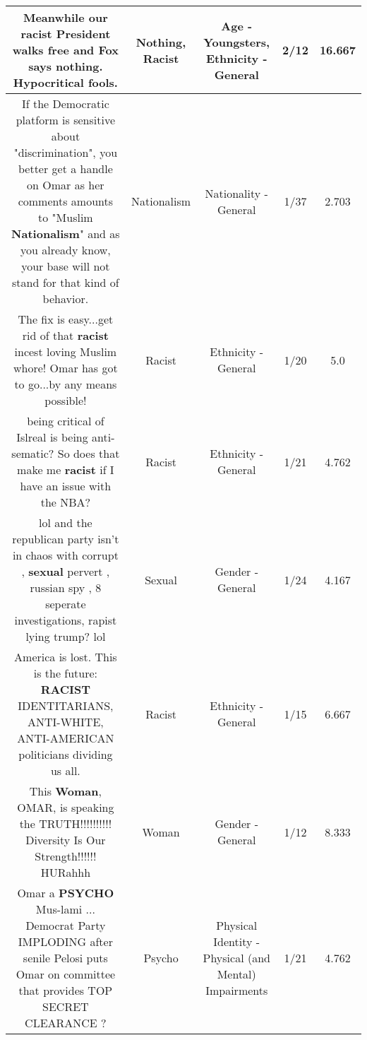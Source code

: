 \documentclass[11pt]{article}
\newlength\mylength
\begin{document}
\begin{center}
\begin{longtable}{|C{.65\mylength}|C{.30\mylength}|C{.12\mylength}|C{.12\mylength}|C{.12\mylength}|}
  \small Meanwhile our \textbf{racist} President walks free and Fox says \textbf{nothing}. Hypocritical fools.\normalsize   & Nothing, Racist & Age - Youngsters, Ethnicity - General & 2/12 & 16.667 \\  \hline
  \small If the Democratic platform is sensitive about "discrimination", you better get a handle on Omar as her comments amounts to "Muslim \textbf{Nationalism}" and as you already know, your base will not stand for that kind of behavior.\normalsize   & Nationalism & Nationality - General & 1/37 & 2.703 \\  \hline
  \small The fix is easy...get rid of that \textbf{racist} incest loving Muslim whore! Omar has got to go...by any means possible!\normalsize   & Racist & Ethnicity - General & 1/20 & 5.0 \\  \hline
  \small being critical of Islreal is being anti-sematic? So does that make me \textbf{racist} if I have an issue with the NBA?\normalsize   & Racist & Ethnicity - General & 1/21 & 4.762 \\  \hline
  \small lol and the republican party isn't in chaos with corrupt , \textbf{sexual} pervert , russian spy , 8 seperate investigations, rapist lying trump? lol\normalsize   & Sexual & Gender - General & 1/24 & 4.167 \\  \hline
  \small America is lost. This is the future: \textbf{RACIST} IDENTITARIANS, ANTI-WHITE, ANTI-AMERICAN politicians dividing us all.\normalsize   & Racist & Ethnicity - General & 1/15 & 6.667 \\  \hline
  \small This \textbf{Woman}, OMAR, is speaking the TRUTH!!!!!!!!!!  Diversity Is Our Strength!!!!!!  HURahhh\normalsize   & Woman & Gender - General & 1/12 & 8.333 \\  \hline
  \small Omar a \textbf{PSYCHO} Mus-lami ... Democrat Party IMPLODING after senile Pelosi puts Omar on committee that provides TOP SECRET CLEARANCE ?\normalsize   & Psycho & Physical Identity - Physical (and Mental) Impairments & 1/21 & 4.762 \\  \hline

\end{longtable}
\end{center}
\end{document}
